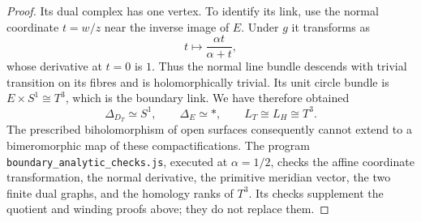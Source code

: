\begin{proof}
Its dual complex has one vertex. To identify its link, use the normal coordinate $t=w/z$ near the inverse image of $E$. Under $g$ it transforms as
\[
 t\longmapsto\frac{\alpha t}{\alpha+t},
\]
whose derivative at $t=0$ is $1$. Thus the normal line bundle descends with trivial transition on its fibres and is holomorphically trivial. Its unit circle bundle is $E\times S^1\cong T^3$, which is the boundary link. We have therefore obtained
\[
 \Delta_{D_T}\simeq S^1,\qquad\Delta_E\simeq *,
 \qquad L_T\cong L_H\cong T^3.
\]
The prescribed biholomorphism of open surfaces consequently cannot extend to a bimeromorphic map of these compactifications. The program \texttt{boundary\_analytic\_checks.js}, executed at $\alpha=1/2$, checks the affine coordinate transformation, the normal derivative, the primitive meridian vector, the two finite dual graphs, and the homology ranks of $T^3$. Its checks supplement the quotient and winding proofs above; they do not replace them.
\end{proof}

